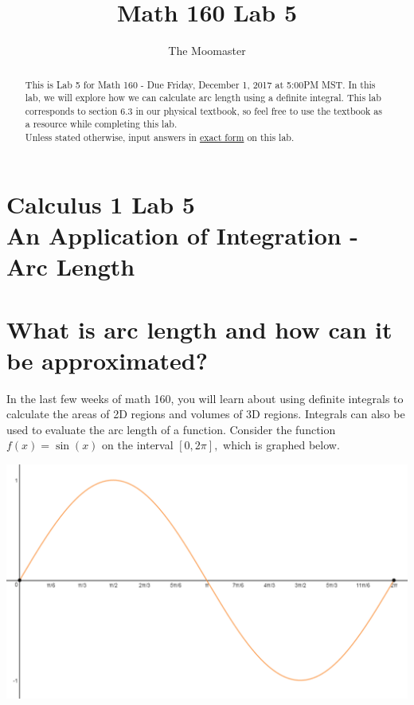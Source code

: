 \documentclass[handout,nooutcomes]{ximera}
\title{Math 160 Lab 5}
\author{The Moomaster}
\begin{document}
\section{Calculus 1 Lab 5 \\ An Application of Integration - Arc Length}

\begin{abstract}
This is Lab 5 for Math 160 - Due Friday, December 1, 2017 at 5:00PM MST.  In this lab, we will explore how we can calculate arc length using a definite integral.  This lab corresponds to section 6.3 in our physical textbook, so feel free to use the textbook as a resource while completing this lab.\\

Unless stated otherwise, input answers in \underline{exact form} on this lab.
\end{abstract}
 
\maketitle


\section {What is arc length and how can it be approximated?}

In the last few weeks of math 160, you will learn about using definite integrals to calculate the areas of 2D regions and volumes of 3D regions.  Integrals can also be used to evaluate the arc length of a function.  Consider the function $f(x) = \sin(x)$ on the interval $[0,2\pi],$ which is graphed below.  \\

\begin{center} \includegraphics{sinx.png} \end{center}
\end{document}
